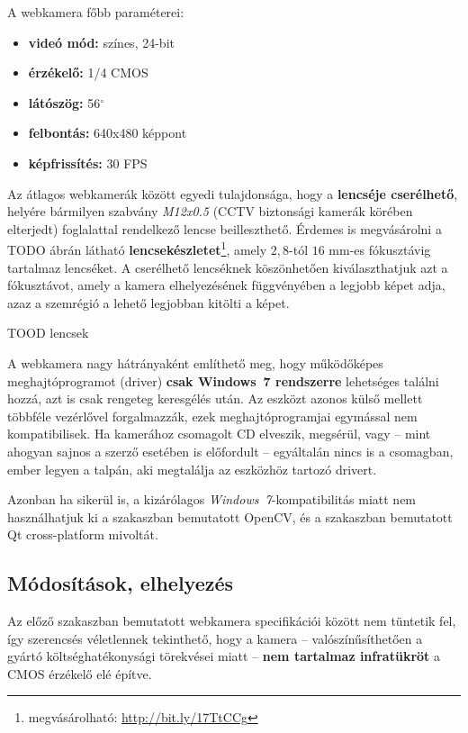 A webkamera főbb paraméterei:

\begin{itemize}
  \item \textbf{videó mód:} színes, 24-bit 
  \item \textbf{érzékelő:} 1/4 CMOS
  \item \textbf{látószög:} 56$^{\circ}$
  \item \textbf{felbontás:} 640x480 képpont
  \item \textbf{képfrissítés:} 30 FPS
\end{itemize}

Az átlagos webkamerák között egyedi tulajdonsága, hogy a \textbf{lencséje cserélhető}, helyére bármilyen szabvány \emph{M12x0.5} (CCTV biztonsági kamerák körében elterjedt) foglalattal rendelkező lencse beilleszthető. Érdemes is megvásárolni a TODO ábrán látható \textbf{lencsekészletet}\footnote{megvásárolható: \url{http://bit.ly/17TtCCg}}, amely $2,\!8$-tól $16$ mm-es fókusztávig tartalmaz lencséket. A cserélhető lencséknek köszönhetően kiválaszthatjuk azt a fókusztávot, amely a kamera elhelyezésének függvényében a legjobb képet adja, azaz a szemrégió a lehető legjobban kitölti a képet.

TOOD lencsek

A webkamera nagy hátrányaként említhető meg, hogy működőképes meghajtóprogramot (driver) \textbf{csak Windows~7 rendszerre} lehetséges találni hozzá, azt is csak rengeteg keresgélés után. Az eszközt azonos külső mellett többféle vezérlővel forgalmazzák, ezek meghajtóprogramjai egymással nem kompatibilisek. Ha kamerához csomagolt CD elveszik, megsérül, vagy -- mint ahogyan sajnos a szerző esetében is előfordult -- egyáltalán nincs is a csomagban, ember legyen a talpán, aki megtalálja az eszközhöz tartozó drivert.

Azonban ha sikerül is, a kizárólagos \emph{Windows~7}-kompatibilitás miatt nem használhatjuk ki a  szakaszban bemutatott OpenCV, és a  szakaszban bemutatott Qt cross-platform mivoltát.

\subsection{Módosítások, elhelyezés}\label{sect:infracam_mod}

Az előző szakaszban bemutatott webkamera specifikációi között nem tüntetik fel, így szerencsés véletlennek tekinthető, hogy a kamera -- valószínűsíthetően a gyártó költséghatékonysági törekvései miatt -- \textbf{nem tartalmaz infratükröt} a CMOS érzékelő elé építve.

